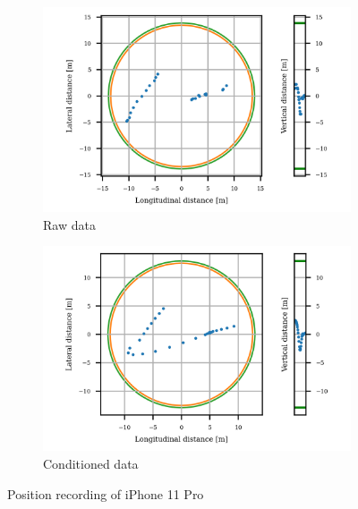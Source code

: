 \documentclass{article}
\begin{document}
			\begin{figure}[h]
		   		\centering
		     	\begin{subfigure}[b]{0.45\textwidth} 
		      		\centering
		      	  	\includegraphics[width=\textwidth]{Static/raw_static_IPhone 11 Pro.png}
		      	  	\caption{Raw data}
		     	\end{subfigure}
		     	\begin{subfigure}[b]{0.45\textwidth}
		      	   \centering
		      	   \includegraphics[width=\textwidth]{Static/cond_static_IPhone 11 Pro.png}
		      	   \caption{Conditioned data}
		     	\end{subfigure} 	
		      \caption{Position recording of iPhone 11 Pro}
		      \label{fig:static_loc_iPhone}
			\end{figure}		
\end{document}
